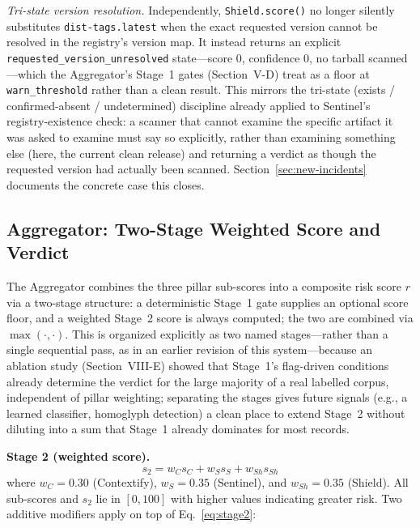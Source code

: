 \documentclass[journal]{IEEEtran}
\begin{document}
\emph{Tri-state version resolution.} Independently, \texttt{Shield.score()} no longer silently substitutes
\texttt{dist-tags.latest} when the exact requested version cannot be resolved in the registry's version map.
It instead returns an explicit \texttt{requested\_version\_unresolved} state---score 0, confidence 0, no
tarball scanned---which the Aggregator's Stage~1 gates (Section~V-D) treat as a floor at
\texttt{warn\_threshold} rather than a clean result. This mirrors the tri-state (exists / confirmed-absent /
undetermined) discipline already applied to Sentinel's registry-existence check: a scanner that cannot
examine the specific artifact it was asked to examine must say so explicitly, rather than examining something
else (here, the current clean release) and returning a verdict as though the requested version had actually
been scanned. Section~\ref{sec:new-incidents} documents the concrete case this closes.

\subsection{Aggregator: Two-Stage Weighted Score and Verdict}
The Aggregator combines the three pillar sub-scores into a composite risk score $r$ via a two-stage
structure: a deterministic Stage~1 gate supplies an optional score floor, and a weighted Stage~2 score is
always computed; the two are combined via $\max(\cdot,\cdot)$. This is organized explicitly as two named
stages---rather than a single sequential pass, as in an earlier revision of this system---because an
ablation study (Section~VIII-E) showed that Stage~1's flag-driven conditions already determine the verdict
for the large majority of a real labelled corpus, independent of pillar weighting; separating the stages
gives future signals (e.g., a learned classifier, homoglyph detection) a clean place to extend Stage~2
without diluting into a sum that Stage~1 already dominates for most records.

\textbf{Stage 2 (weighted score).}
\begin{equation}
s_2 = w_C s_C + w_S s_S + w_{Sh} s_{Sh}
\label{eq:stage2}
\end{equation}
where $w_C = 0.30$ (Contextify), $w_S = 0.35$ (Sentinel), and $w_{Sh} = 0.35$ (Shield). All sub-scores and
$s_2$ lie in $[0,100]$ with higher values indicating greater risk. Two additive modifiers apply on top of
Eq.~\eqref{eq:stage2}:
\end{document}
